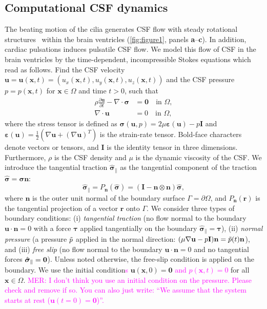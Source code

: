 \documentclass[fleqn]{wlscirep}
\newcommand{\pdifft}[1]{\frac{\partial  #1}{\partial t}}
\newcommand{\nn}{\mathbf{n}}
\newcommand{\rr}{\mathbf{r}}
\newcommand{\uu}{\mathbf{u}}
\newcommand{\xx}{\bm{x}}
\newcommand{\bsig}{\bm{\sigma}}
\newcommand{\bsigpar}{\hat{\bsig}_{\parallel}}
\newcommand{\beps}{\bm{\varepsilon}}
\newcommand{\btau}{\bm{\tau}}
\newcommand{\mer}[1]{\textcolor{magenta}{#1}}
\begin{document}
\subsection*{Computational CSF dynamics}

The beating motion of the cilia generates CSF flow with steady rotational structures~\cite{Olstad2019CiliaryDevelopment} within the brain ventricles (\cref{fig:figure1}, panels \textbf{a}--\textbf{c}). In addition, cardiac pulsations induces pulsatile CSF flow. We model this flow of CSF in the brain ventricles by the time-dependent, incompressible Stokes equations which read as follows. Find the CSF velocity $\uu = \uu(\xx, t) = (u_x(\xx, t), u_y(\xx, t), u_z(\xx, t))$ and the CSF pressure $p = p(\xx, t)$ for $\xx \in \Omega$ and time $t>0$, such that
\begin{subequations}
    \begin{align}
      \rho \pdifft{\uu} - \nabla \cdot \bsig &= \mathbf{0}
      \quad \text{in } \Omega,
      \label{eq:stokes_eq_mom}\\
      \nabla \cdot \uu &= 0
      \quad  \text{in } \Omega,
  \end{align}
  \label{eq:stokes_eqs}%
\end{subequations}%
where the stress tensor is defined as $\bsig(\uu, p) = 2\mu\beps(\uu) - p\mathbf{I}$ and $\beps(\uu) = \frac{1}{2}\left(\nabla \uu + (\nabla\uu)^T\right)$ is the strain-rate tensor. Bold-face characters denote vectors or tensors, and $\mathbf{I}$ is the identity tensor in three dimensions. Furthermore, $\rho$ is the CSF density and $\mu$ is the dynamic viscosity of the CSF. We introduce the tangential traction $\bsigpar$ as the tangential component of the traction $\hat{\bsig}=\bsig\nn$:
\begin{equation*}
    \bsigpar = P_{\nn}(\hat{\bsig}) = (\mathbf{I} - \nn\otimes\nn)\hat{\bsig},
\end{equation*}
where $\nn$ is the outer unit normal of the boundary surface $\Gamma = \partial\Omega$, and $P_{\nn}(\rr)$ is the tangential  projection of a vector $\rr$ onto $\Gamma$. We consider three types of boundary conditions:  (i) \emph{tangential traction} (no flow normal to the boundary $\uu \cdot \nn = 0$ with a force $\btau$ applied tangentially on the boundary $\bsigpar = \btau$), (ii) \emph{normal pressure} (a pressure $\Tilde{p}$ applied in the normal direction: $(\mu\nabla\uu - p\mathbf{I})\nn = \Tilde{p}(t)\nn$), and (iii) \emph{free slip} (no flow normal to the boundary $\uu \cdot \nn = 0$ and no tangential forces $\bsigpar = {\bf 0}$). Unless noted otherwise, the free-slip condition is applied on the boundary. We use the initial condition\mer{s} $\uu(\xx, 0)=\mathbf{0}$ \mer{and $p(\xx, t) = 0$} for all $\xx\in\Omega$. \mer{MER: I don't think you use an initial condition on the pressure. Please check and remove if so. You can also just write: ``We assume that the system starts at rest ($\uu(t = 0) = \mathbf{0}$)''.}
\end{document}
